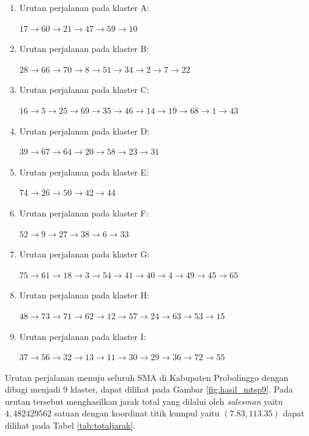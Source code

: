 \begin{enumerate}
\item Urutan perjalanan pada klaster A:

$17\rightarrow60\rightarrow21\rightarrow47\rightarrow59\rightarrow10$

\item Urutan perjalanan pada klaster B:

$28\rightarrow66\rightarrow70\rightarrow8\rightarrow51\rightarrow34\rightarrow2\rightarrow7\rightarrow22$

\item Urutan perjalanan pada klaster C:

$16\rightarrow5\rightarrow25\rightarrow69\rightarrow35\rightarrow46\rightarrow14\rightarrow19\rightarrow68\rightarrow1\rightarrow43$

\item Urutan perjalanan pada klaster D:

$39\rightarrow67\rightarrow64\rightarrow20\rightarrow58\rightarrow23\rightarrow31$

\item Urutan perjalanan pada klaster E:

$74\rightarrow26\rightarrow50\rightarrow42\rightarrow44$

\item Urutan perjalanan pada klaster F:

$52\rightarrow9\rightarrow27\rightarrow38\rightarrow6\rightarrow33$

\item Urutan perjalanan pada klaster G:

$75\rightarrow61\rightarrow18\rightarrow3\rightarrow54\rightarrow41\rightarrow40\rightarrow4\rightarrow49\rightarrow45\rightarrow65$

\item Urutan perjalanan pada klaster H:

$48\rightarrow73\rightarrow71\rightarrow62\rightarrow12\rightarrow57\rightarrow24\rightarrow63\rightarrow53\rightarrow15$

\item Urutan perjalanan pada klaster I:

$37\rightarrow56\rightarrow32\rightarrow13\rightarrow11\rightarrow30\rightarrow29\rightarrow36\rightarrow72\rightarrow55$

\end{enumerate}

Urutan perjalanan menuju seluruh SMA di Kabupaten Probolinggo dengan dibagi menjadi 9 klaster, dapat dilihat pada Gambar \ref{fig:hasil_mtsp9}. Pada urutan tersebut menghasilkan jarak total yang dilalui oleh \textit{salesman} yaitu $4,482429562$ satuan dengan koordinat titik kumpul yaitu $(7.83, 113.35)$ dapat dilihat pada Tabel \ref{tab:totaljarak}.

